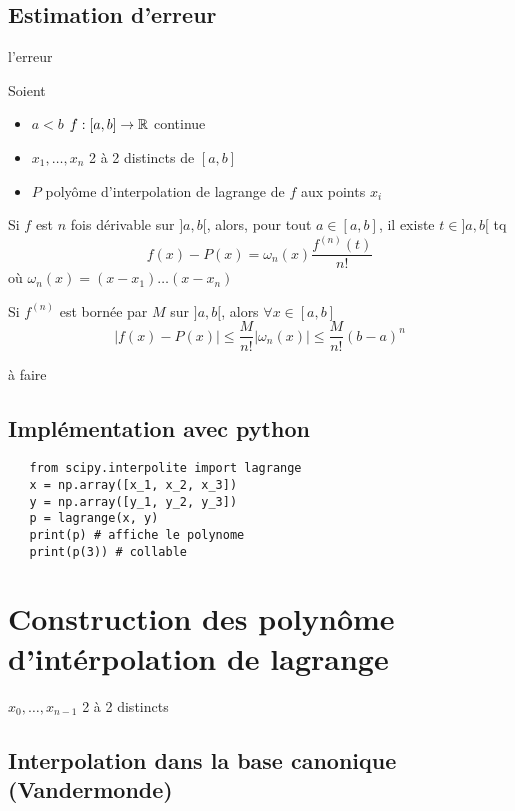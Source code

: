 \subsection{Estimation d'erreur}
\begin{theorem}
    l'erreur  \par
    Soient
    \begin{itemize}
        \item $a < b$  $f: [a, b] \to \mathbb{R}$ continue
        \item $x_1, \ldots, x_n$ 2 à 2 distincts de $[a, b]$
        \item  $P$ polyôme d'interpolation de lagrange de  $f$ aux points  $x_i$
    \end{itemize}
    Si $f$ est $n$ fois dérivable sur  $]a, b[$, alors, pour tout  $a \in [a, b]$, il existe  $t \in ]a, b[$ tq 
     \[
         f(x) - P(x) = \omega_n(x)\frac{f^{(n)}(t)}{n!}
    \] 
    où $\omega_n(x) = (x - x_1)\ldots(x - x_n)$
\end{theorem}
\begin{corollary}
    Si $f^{(n)}$ est bornée par  $M$ sur  $]a, b[$, alors  $\forall x \in [a, b]$ 
    \[
    |f(x) - P(x)| \le \frac{M}{n!}|\omega_n(x)| \le \frac{M}{n!}(b - a)^n
    \] 
\end{corollary}
\begin{preuve}
    à faire
\end{preuve}

\subsection{Implémentation avec python}
\begin{lstlisting}
   from scipy.interpolite import lagrange
   x = np.array([x_1, x_2, x_3])
   y = np.array([y_1, y_2, y_3])
   p = lagrange(x, y)
   print(p) # affiche le polynome
   print(p(3)) # collable
\end{lstlisting}

\section{Construction des polynôme d'intérpolation de lagrange}
$x_0, \ldots, x_{n-1}$ 2 à 2 distincts
\subsection{Interpolation dans la base canonique (Vandermonde)}
